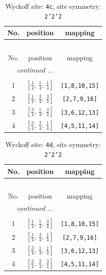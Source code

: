 \documentclass[fleqn,8pt]{jsarticle}
\begin{document}
\renewcommand{\arraystretch}{1.2}
\begin{longtable}{ccc}
\caption{Wyckoff site: {\tt 4c}, site symmetry: {\tt 2'2'2}}
 \\
 \hline \hline
No. & position & mapping \\ \hline \endfirsthead

\multicolumn{2}{l}{\tablename\ \thetable{}} \\
 \hline \hline
No. & position & mapping \\ \hline \endhead

 \hline \hline
\multicolumn{2}{r}{\footnotesize\it continued ...} \\ \endfoot

 \hline \hline
\multicolumn{2}{r}{} \\ \endlastfoot

1 & $\left[ \frac{1}{4},\, \frac{1}{4},\, \frac{1}{4} \right]$ & {\tt [1,8,10,15]} \\ \hline
2 & $\left[ \frac{1}{4},\, \frac{3}{4},\, \frac{3}{4} \right]$ & {\tt [2,7,9,16]} \\ \hline
3 & $\left[ \frac{3}{4},\, \frac{1}{4},\, \frac{3}{4} \right]$ & {\tt [3,6,12,13]} \\ \hline
4 & $\left[ \frac{3}{4},\, \frac{3}{4},\, \frac{1}{4} \right]$ & {\tt [4,5,11,14]} \\
\end{longtable}
\renewcommand{\arraystretch}{1.2}
\begin{longtable}{ccc}
\caption{Wyckoff site: {\tt 4d}, site symmetry: {\tt 2'2'2}}
 \\
 \hline \hline
No. & position & mapping \\ \hline \endfirsthead

\multicolumn{2}{l}{\tablename\ \thetable{}} \\
 \hline \hline
No. & position & mapping \\ \hline \endhead

 \hline \hline
\multicolumn{2}{r}{\footnotesize\it continued ...} \\ \endfoot

 \hline \hline
\multicolumn{2}{r}{} \\ \endlastfoot

1 & $\left[ \frac{1}{4},\, \frac{1}{4},\, \frac{3}{4} \right]$ & {\tt [1,8,10,15]} \\ \hline
2 & $\left[ \frac{1}{4},\, \frac{3}{4},\, \frac{1}{4} \right]$ & {\tt [2,7,9,16]} \\ \hline
3 & $\left[ \frac{3}{4},\, \frac{1}{4},\, \frac{1}{4} \right]$ & {\tt [3,6,12,13]} \\ \hline
4 & $\left[ \frac{3}{4},\, \frac{3}{4},\, \frac{3}{4} \right]$ & {\tt [4,5,11,14]} \\
\end{longtable}
\end{document}
